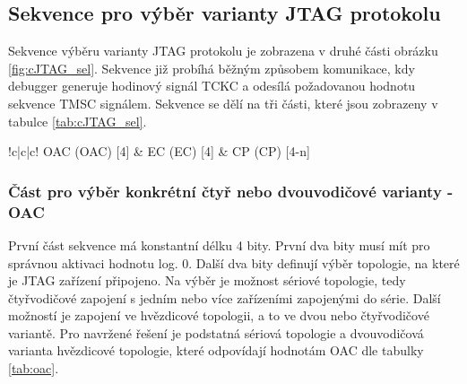 
\subsection{Sekvence pro výběr varianty \acs{JTAG} protokolu}
Sekvence výběru varianty \acs{JTAG} protokolu je zobrazena v druhé části obrázku \ref{fig:cJTAG_sel}. Sekvence již probíhá běžným způsobem komunikace, kdy debugger generuje hodinový signál \acs{TCKC} a odesílá požadovanou hodnotu sekvence \acs{TMSC} signálem. Sekvence se dělí na tři části, které jsou zobrazeny v tabulce \ref{tab:cJTAG_sel}.

\begin{table}[!h]
  \caption{Formát sekvence pro výběr varianty \acs{JTAG} protokolu \cite{IEEE_1149-7}}
  \begin{center}
  	\small
	  \begin{tabular}{!{\vrule width 1.2pt}c|c|c!{\vrule width 1.2pt}}
				\acl{OAC} (\acs{OAC}) [4] & \acl{EC} (\acs{EC}) [4] & \acl{CP} (\acs{CP}) [4-n]\\
		\end{tabular}
  \end{center}
	\label{tab:cJTAG_sel}
\end{table}

\subsubsection{Část pro výběr konkrétní čtyř nebo dvouvodičové varianty - \acs{OAC}}
První část sekvence má konstantní délku 4 bity. První dva bity musí mít pro správnou aktivaci hodnotu log. 0. Další dva bity definují výběr topologie, na které je \acs{JTAG} zařízení připojeno. Na výběr je možnost sériové topologie, tedy čtyřvodičové zapojení s jedním nebo více zařízeními zapojenými do série. Další možností je zapojení ve hvězdicové topologii, a to ve dvou nebo čtyřvodičové variantě. Pro navržené řešení je podstatná sériová topologie a dvouvodičová varianta hvězdicové topologie, které odpovídají hodnotám \acs{OAC} dle tabulky \ref{tab:oac}. \cite{IEEE_1149-7}

